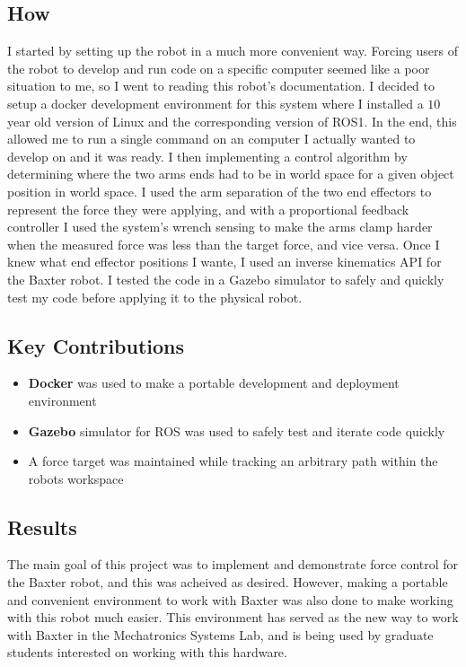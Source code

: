 \documentclass[11pt]{article}
\begin{document}
\subsection*{How}
I started by setting up the robot in a much more convenient way. Forcing users of the robot to develop and run code on a specific computer seemed like a poor situation to me, so I went to reading this robot's documentation. I decided to setup a docker development environment for this system where I installed a $10$ year old version of Linux and the corresponding version of ROS1. In the end, this allowed me to run a single command on an computer I actually wanted to develop on and it was ready. I then implementing a control algorithm by determining where the two arms ends had to be in world space for a given object position in world space. I used the arm separation of the two end effectors to represent the force they were applying, and with a proportional feedback controller I used the system's wrench sensing to make the arms clamp harder when the measured force was less than the target force, and vice versa. Once I knew what end effector positions I wante, I used an inverse kinematics API for the Baxter robot. I tested the code in a Gazebo simulator to safely and quickly test my code before applying it to the physical robot. 
\subsection*{Key Contributions}
\begin{itemize}
    \item \textbf{Docker} was used to make a portable development and deployment environment
    \item \textbf{Gazebo} simulator for ROS was used to safely test and iterate code quickly
    \item A force target was maintained while tracking an arbitrary path within the robots workspace
\end{itemize}
\subsection*{Results}
The main goal of this project was to implement and demonstrate force control for the Baxter robot, and this was acheived as desired. However, making a portable and convenient environment to work with Baxter was also done to make working with this robot much easier. This environment has served as the new way to work with Baxter in the Mechatronics Systems Lab, and is being used by graduate students interested on working with this hardware.
\end{document}
